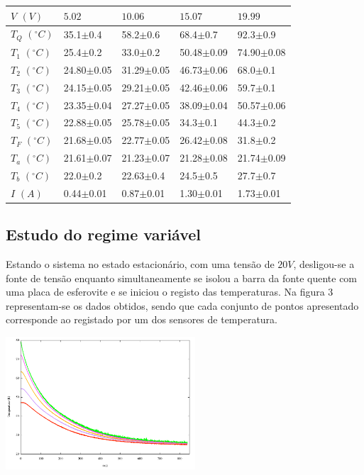 \documentclass[8pt]{extarticle}
\begin{document}
\begin{multicols}{2}
{\small
\begin{center}
\begin{tabular}{ x{1.2cm} x{1.6cm} x{1.6cm} x{1.6cm} x{1.6cm} } 
$V$ $(V)$ & $5.02$ & $10.06$ & $15.07$ & $19.99$ \tabularnewline
\hline \hline
$T_Q$ $(^\circ C)$ & 35.1$\pm$0.4   & 58.2$\pm$0.6   & 68.4$\pm$0.7   & 92.3$\pm$0.9 \tabularnewline
$T_1$ $(^\circ C)$ & 25.4$\pm$0.2   & 33.0$\pm$0.2   & 50.48$\pm$0.09 & 74.90$\pm$0.08 \tabularnewline
$T_2$ $(^\circ C)$ & 24.80$\pm$0.05 & 31.29$\pm$0.05 & 46.73$\pm$0.06 & 68.0$\pm$0.1 \tabularnewline
$T_3$ $(^\circ C)$ & 24.15$\pm$0.05 & 29.21$\pm$0.05 & 42.46$\pm$0.06 & 59.7$\pm$0.1 \tabularnewline
$T_4$ $(^\circ C)$ & 23.35$\pm$0.04 & 27.27$\pm$0.05 & 38.09$\pm$0.04 & 50.57$\pm$0.06 \tabularnewline
$T_5$ $(^\circ C)$ & 22.88$\pm$0.05 & 25.78$\pm$0.05 & 34.3$\pm$0.1   & 44.3$\pm$0.2 \tabularnewline
$T_F$ $(^\circ C)$ & 21.68$\pm$0.05 & 22.77$\pm$0.05 & 26.42$\pm$0.08 & 31.8$\pm$0.2 \tabularnewline
$T_a$ $(^\circ C)$ & 21.61$\pm$0.07 & 21.23$\pm$0.07 & 21.28$\pm$0.08 & 21.74$\pm$0.09 \tabularnewline
$T_b$ $(^\circ C)$ & 22.0$\pm$0.2   & 22.63$\pm$0.4  & 24.5$\pm$0.5  & 27.7$\pm$0.7 \tabularnewline
$I$ $(A)$          & 0.44$\pm$0.01  & 0.87$\pm$0.01  & 1.30$\pm$0.01  & 1.73$\pm$0.01 \tabularnewline
\end{tabular}
\par{}
\end{center}
}

\subsection*{Estudo do regime variável}

\par Estando o sistema no estado estacionário, com uma tensão de $20V$, desligou-se a fonte de tensão enquanto simultaneamente se isolou a barra da fonte quente com uma placa de esferovite e se iniciou o registo das temperaturas. Na figura 3 representam-se os dados obtidos, sendo que cada conjunto de pontos apresentado corresponde ao registado por um dos sensores de temperatura.

\begin{center}
\includegraphics[width=200pt]{tras_2D.pdf}
\par{}
\end{center}


\end{multicols}
\end{document}

